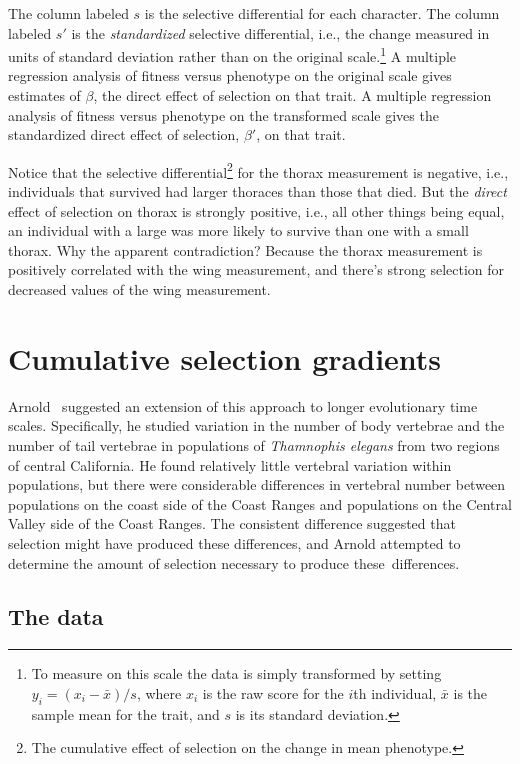 The column labeled $s$ is the selective differential for each
character. The column labeled $s'$ is the {\it standardized\/}
selective differential, i.e., the change measured in units of standard
deviation rather than on the original scale.\footnote{To measure on
  this scale the data is simply transformed by setting $y_i = (x_i -
  \bar x)/s$, where $x_i$ is the raw score for the $i$th individual,
  $\bar x$ is the sample mean for the trait, and $s$ is its standard
  deviation.} A multiple regression analysis of fitness versus
phenotype on the original scale gives estimates of $\beta$, the direct
effect of selection on that trait. A multiple regression analysis of
fitness versus phenotype on the transformed scale gives the
standardized direct effect of selection, $\beta'$, on that trait.

Notice that the selective differential\footnote{The cumulative effect
  of selection on the change in mean phenotype.} for the thorax
measurement is negative, i.e., individuals that survived had larger
thoraces than those that died. But the {\it direct\/} effect of
selection on thorax is strongly positive, i.e., all other things being
equal, an individual with a large was more likely to survive than one
with a small thorax. Why the apparent contradiction? Because the
thorax measurement is positively correlated with the wing measurement,
and there's strong selection for decreased values of the wing
measurement.

\section*{Cumulative selection gradients}

Arnold~\cite{Arnold-1988} suggested an extension of this approach to
longer evolutionary time scales. Specifically, he studied variation in
the number of body vertebrae and the number of tail vertebrae in
populations of {\it Thamnophis elegans} from two regions of central
California. He found relatively little vertebral variation within
populations, but there were considerable differences in vertebral
number between populations on the coast side of the Coast Ranges and
populations on the Central Valley side of the Coast Ranges. The
consistent difference suggested that selection might have produced
these differences, and Arnold attempted to determine the amount of
selection necessary to produce these~differences.

\subsection*{The data}

